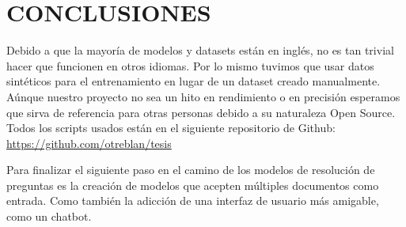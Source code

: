 \documentclass[../main.tex]{subfiles}
\begin{document}
\chapter{CONCLUSIONES}

Debido a que la mayoría de modelos y datasets están en inglés, no es tan trivial hacer que funcionen en otros idiomas.
Por lo mismo tuvimos que usar datos sintéticos para el entrenamiento en lugar de un dataset creado manualmente.
Aúnque nuestro proyecto no sea un hito en rendimiento o en precisión esperamos que sirva de referencia para otras personas debido a su naturaleza Open Source.
Todos los scripts usados están en el siguiente repositorio de Github: \url{https://github.com/otreblan/tesis}

Para finalizar el siguiente paso en el camino de los modelos de resolución de preguntas es la creación de modelos que acepten múltiples documentos como entrada.
Como también la adicción de una interfaz de usuario más amigable, como un chatbot.

%
%
\end{document}
